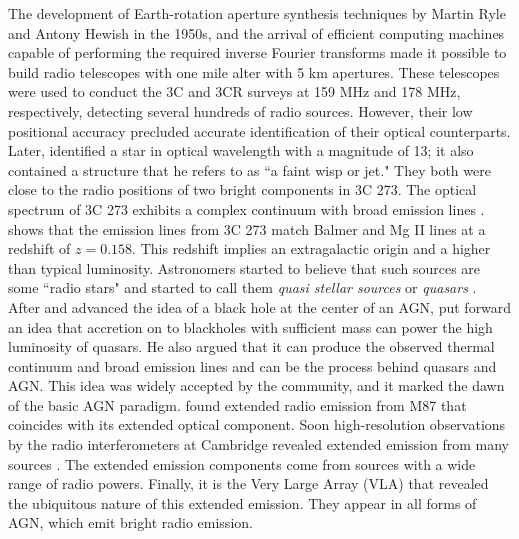 The development of Earth-rotation aperture synthesis techniques by Martin Ryle and Antony Hewish in the 1950s, and the arrival of efficient computing machines capable of performing the required inverse Fourier transforms made it possible to build radio telescopes with one mile alter with 5 km apertures. These telescopes 
were used to conduct the 3C and 3CR surveys at 159 MHz and 178 MHz, respectively, detecting several hundreds of radio sources. However, their low positional accuracy precluded accurate identification of their optical counterparts. 
Later, \citet{schmidt19633c} identified a star in optical wavelength with a magnitude of 13; it also contained a structure that he refers to as ``a faint wisp or jet." They both were close to the radio positions of two bright components in 3C 273. The optical spectrum of  3C 273 exhibits a complex continuum with broad emission lines \citep{oke1963absolute}.
\citet{schmidt19633c} shows that the emission lines from 3C 273 match Balmer and Mg II lines at a redshift of $z=0.158$. This redshift implies an extragalactic origin and a higher than typical luminosity. Astronomers started to believe that such sources are some ``radio stars" and started to call them \textit{quasi stellar sources} or \textit{quasars} \citep{chiu1964gravitational}. After \citet{salpeter1964accretion} and \citet{zel1964estimating} advanced the idea of a black hole at the center of an AGN, \citet{lynden1969galactic} put forward an idea that accretion on to blackholes with sufficient mass can power the high luminosity of quasars. He also argued that it can produce the observed thermal continuum and broad emission lines and can be the process behind quasars and AGN. This idea was widely accepted by the community, and it marked the dawn of the basic AGN paradigm.
\citet{hogg1969synthesis} found extended radio emission from M87 that coincides with its extended optical component. Soon high-resolution observations by the radio interferometers at Cambridge revealed extended emission from many sources \citep[e.g.,][]{1973MNRAS.165..369N,turland19753c}. The extended emission components come from sources with a wide range of radio powers. Finally, it is the Very Large Array (VLA) that revealed the ubiquitous nature of this extended emission. They appear in all forms of AGN, which emit bright radio emission.
